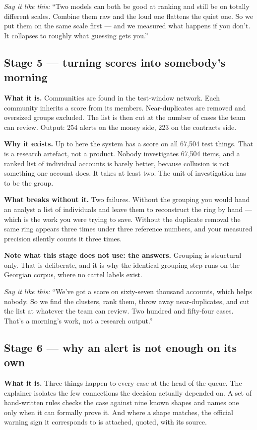 \documentclass[11pt,a4paper]{article}
\newcommand{\aloud}[1]{\par\smallskip\noindent\textit{\textcolor{accent}{Say
it like this:}} ``#1''\par\smallskip}
\begin{document}
\aloud{Two models can both be good at ranking and still be on totally different
scales. Combine them raw and the loud one flattens the quiet one. So we put
them on the same scale first --- and we measured what happens if you don't. It
collapses to roughly what guessing gets you.}

\subsection{Stage 5 --- turning scores into somebody's morning}

\textbf{What it is.} Communities are found in the test-window network. Each
community inherits a score from its members. Near-duplicates are removed and
oversized groups excluded. The list is then cut at the number of cases the team
can review. Output: 254 alerts on the money side, 223 on the contracts side.

\textbf{Why it exists.} Up to here the system has a score on all 67{,}504 test
things. That is a research artefact, not a product. Nobody investigates
67{,}504 items, and a ranked list of individual accounts is barely better,
because collusion is not something one account does. It takes at least two.
The unit of investigation has to be the group.

\textbf{What breaks without it.} Two failures. Without the grouping you would
hand an analyst a list of individuals and leave them to reconstruct the ring by
hand --- which is the work you were trying to save. Without the duplicate
removal the same ring appears three times under three reference numbers, and
your measured precision silently counts it three times.

\textbf{Note what this stage does not use: the answers.} Grouping is structural
only. That is deliberate, and it is why the identical grouping step runs on the
Georgian corpus, where no cartel labels exist.

\aloud{We've got a score on sixty-seven thousand accounts, which helps nobody.
So we find the clusters, rank them, throw away near-duplicates, and cut the
list at whatever the team can review. Two hundred and fifty-four cases. That's
a morning's work, not a research output.}

\subsection{Stage 6 --- why an alert is not enough on its own}

\textbf{What it is.} Three things happen to every case at the head of the
queue. The explainer isolates the few connections the decision actually
depended on. A set of hand-written rules checks the case against nine known
shapes and names one only when it can formally prove it. And where a shape
matches, the official warning sign it corresponds to is attached, quoted, with
its source.
\end{document}
